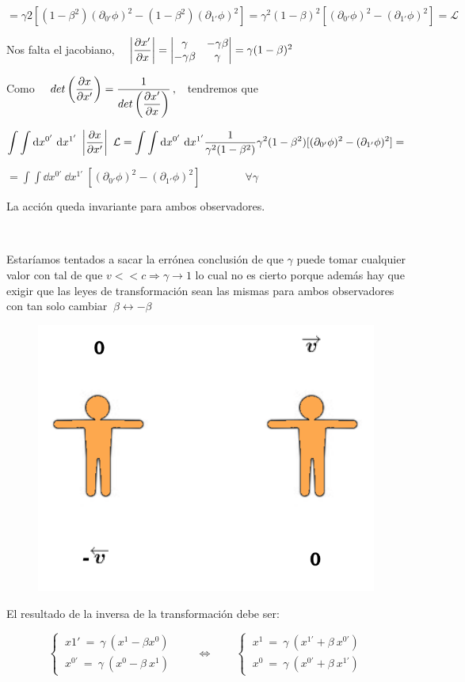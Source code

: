 $=\gamma2 [ (1-\beta^2) (\partial_{0'} \phi)^2 - (1-\beta^2) (\partial_{1'} \phi)^2 ] = \gamma^2 (1-\beta)^2 [(\partial_{0'} \phi)^2 - (\partial_{1'} \phi)^2]=\mathcal L$

Nos falta el jacobiano, $\quad \left|\displaystyle \pdv{x'}{x} \right|=\mqty|\gamma & -\gamma \beta \\ -\gamma \beta & \gamma |=\gamma (1-\beta)^2$

Como $\quad \displaystyle det\left( \pdv{x}{x'} \right) = \dfrac 1 {det \left( \displaystyle \pdv{x'}{x} \right) }\, , \ \ $ tendremos que

$\displaystyle \int \int \dd x^{0'} \ \dd x^{1'} \ \left| \displaystyle \pdv{x}{x'} \right| \ \mathcal L = \int \int \dd x^{0'} \ \dd x^{1'}  \dfrac 1 {\gamma^2 (1-\beta^2)}\gamma^2 (1-\beta^2) [(\partial_{0'} \phi)^2 - (\partial_{1'} \phi)^2] = $

$\displaystyle = \int \int \dd x^{0'} \ \dd x^{1'} \ [(\partial_{0'} \phi)^2 - (\partial_{1'} \phi)^2] \qquad \qquad \forall \gamma$

La acción queda invariante para ambos observadores. 




\begin{multicols}{2}
$\quad$

Estaríamos tentados a sacar la errónea conclusión de que $\gamma$ puede tomar cualquier valor con tal de que $v<<c \Rightarrow \gamma \to 1$ lo cual no es cierto porque además hay que exigir que las leyes de transformación sean las mismas para ambos observadores con tan solo cambiar $\ \beta \leftrightarrow -\beta$ 

	\begin{figure}[H]
	\centering
	\includegraphics[width=.4\textwidth]{imagenes/img29-05.png}
\end{figure}
\end{multicols}


El resultado de la inversa de la transformación debe ser:

$$\begin{cases}
\ x{1'} \ = \ \gamma \ (x^1-\beta x^0 )	 \\ \ x^{0'} \ = \ \gamma \ (x^0- \beta \ x^1)	
\end{cases}
\qquad \Leftrightarrow \qquad 
\begin{cases}
\ x^1 \ = \ \gamma \ (x^{1'}+\beta \ x^{0'} )	 \\ \ x^0 \ = \ \gamma \ (x^{0'} + \beta \ x^{1'})	
\end{cases}$$

